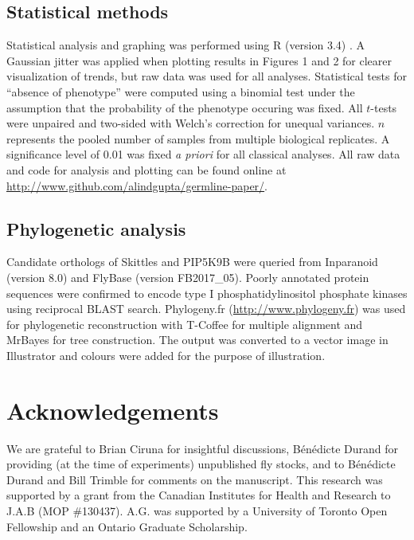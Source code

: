 \documentclass[12pt, twoside, letterpaper]{article}
\begin{document}
\begin{doublespacing}
\begin{linenumbers}
    \subsection*{Statistical methods}
    Statistical analysis and graphing was performed using R (version 3.4)
    \citep{r}.
    A Gaussian jitter was applied when plotting
    results in Figures 1 and 2 for clearer visualization of trends,
    but raw data was used for all analyses.
    Statistical tests for ``absence of phenotype'' were computed using a binomial test
    under the assumption that the probability of the phenotype occuring was fixed.
    All $t$-tests were unpaired and two-sided with Welch's correction for unequal variances.
    $n$ represents the pooled number of samples from multiple biological replicates.
    A significance level of 0.01 was fixed \textit{a priori} for all classical analyses.
    All raw data and code for analysis and plotting can be found online
    at \url{http://www.github.com/alindgupta/germline-paper/}.

    \subsection*{Phylogenetic analysis}
    Candidate orthologs of Skittles and PIP5K9B were queried
    from Inparanoid (version 8.0) and FlyBase (version FB2017\_05).
    Poorly annotated protein sequences were confirmed
    to encode type I phosphatidylinositol phosphate
    kinases using reciprocal BLAST search.
    Phylogeny.fr (\url{http://www.phylogeny.fr}) \citep{dereeper2008phylogeny} was used for
    phylogenetic reconstruction with T-Coffee for multiple alignment
    and MrBayes for tree construction.
    The output was converted to a vector image in Illustrator
    and colours were added for the purpose of illustration.

    \section*{Acknowledgements}
    We are grateful to Brian Ciruna for insightful discussions,
    B{\'e}n{\'e}dicte Durand for providing (at the time of experiments)
    unpublished fly stocks, and to
    B{\'e}n{\'e}dicte Durand and Bill Trimble
    for comments on the manuscript.
    This research was supported by a grant from the Canadian Institutes for
    Health and Research to J.A.B (MOP \#130437).
    A.G. was supported by a
    University of Toronto Open Fellowship and
    an Ontario Graduate Scholarship.
    

\end{linenumbers}
\end{doublespacing}
\end{document}
